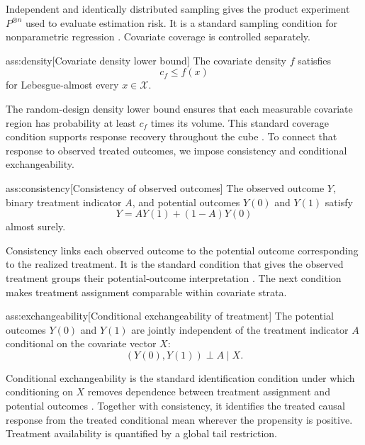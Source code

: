 \documentclass[11pt]{article}
\begin{document}
Independent and identically distributed sampling gives the product experiment \(P^{\otimes n}\) used to evaluate estimation risk. It is a standard sampling condition for nonparametric regression \citep{Stone1982}. Covariate coverage is controlled separately.

\begin{assumptionv}{ass:density}[Covariate density lower bound]
The covariate density \(f\) satisfies
\[
c_f\le f(x)
\]
for Lebesgue-almost every \(x\in\mathcal X\).
\end{assumptionv}

The random-design density lower bound ensures that each measurable covariate region has probability at least \(c_f\) times its volume. This standard coverage condition supports response recovery throughout the cube \citep{Stone1982}. To connect that response to observed treated outcomes, we impose consistency and conditional exchangeability.

\begin{assumptionv}{ass:consistency}[Consistency of observed outcomes]
The observed outcome \(Y\), binary treatment indicator \(A\), and potential outcomes \(Y(0)\) and \(Y(1)\) satisfy
\[
Y=AY(1)+(1-A)Y(0)
\]
almost surely.
\end{assumptionv}

Consistency links each observed outcome to the potential outcome corresponding to the realized treatment. It is the standard condition that gives the observed treatment groups their potential-outcome interpretation \citep{KennedyBalakrishnanRobinsWasserman2024}. The next condition makes treatment assignment comparable within covariate strata.

\begin{assumptionv}{ass:exchangeability}[Conditional exchangeability of treatment]
The potential outcomes \(Y(0)\) and \(Y(1)\) are jointly independent of the treatment indicator \(A\) conditional on the covariate vector \(X\):
\[
(Y(0),Y(1))\perp A\mid X.
\]
\end{assumptionv}

Conditional exchangeability is the standard identification condition under which conditioning on \(X\) removes dependence between treatment assignment and potential outcomes \citep{KennedyBalakrishnanRobinsWasserman2024}. Together with consistency, it identifies the treated causal response from the treated conditional mean wherever the propensity is positive. Treatment availability is quantified by a global tail restriction.
\end{document}
